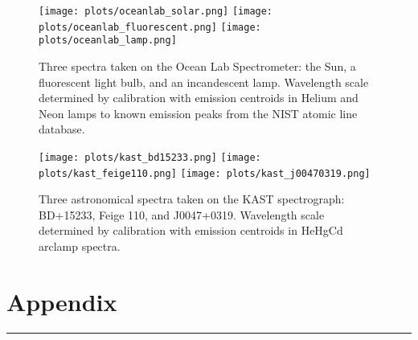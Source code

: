 \documentclass[preprint]{aastex62}
\begin{document}
\begin{figure}[H]
\begin{center}
\texttt{[image: plots/oceanlab\_solar.png]}
\texttt{[image: plots/oceanlab\_fluorescent.png]}
\texttt{[image: plots/oceanlab\_lamp.png]}
\caption{Three spectra taken on the Ocean Lab Spectrometer: the Sun, a fluorescent light bulb, and an incandescent lamp. Wavelength scale determined by calibration with emission centroids in Helium and Neon lamps to known emission peaks from the NIST atomic line database.} \label{fig:oceanlab_specs}
\end{center}
\end{figure}

\begin{figure}[H]
\begin{center}
\texttt{[image: plots/kast\_bd15233.png]}
\texttt{[image: plots/kast\_feige110.png]}
\texttt{[image: plots/kast\_j00470319.png]}
\caption{Three astronomical spectra taken on the KAST spectrograph: BD+15233, Feige 110, and J0047+0319.  Wavelength scale determined by calibration with emission centroids in HeHgCd arclamp spectra.} \label{fig:kast_specs}
\end{center}
\end{figure}
\newpage
\section{Appendix}


\vspace{7pt} \hrule \vspace{7pt}
\end{document}
